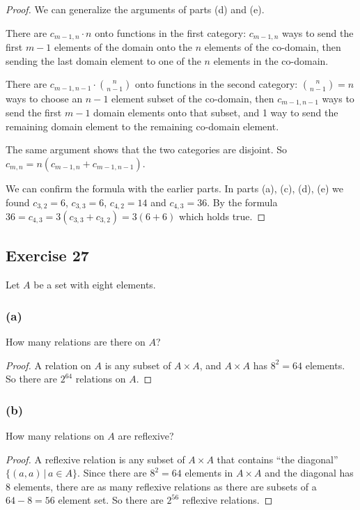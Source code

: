 \documentclass[14pt]{extarticle}
\begin{document}
\begin{proof}
We can generalize the arguments of parts (d) and (e). 

There are \(c_{m-1,n} \cdot n\) onto functions in the first category: \(c_{m-1,n}\) ways to send the first \(m-1\) 
elements of the domain onto the \(n\) elements of the co-domain, then sending the last domain element to one of the 
\(n\) elements in the co-domain.

There are \(c_{m-1,n-1} \cdot \binom{n}{n-1}\) onto functions in the second category: \(\binom{n}{n-1} = n\) ways to choose
an \(n-1\) element subset of the co-domain, then \(c_{m-1,n-1}\) ways to send the first \(m-1\) domain elements onto that
subset, and 1 way to send the remaining domain element to the remaining co-domain element.

The same argument shows that the two categories are disjoint. So \(c_{m,n} = n(c_{m-1,n} + c_{m-1,n-1})\). 

We can confirm the formula with the earlier parts. In parts (a), (c), (d), (e) we found \(c_{3,2} = 6\), \(c_{3,3} = 6\),  
\(c_{4,2} = 14\) and \(c_{4,3} = 36\). By the formula \(36 = c_{4,3} = 3(c_{3,3} + c_{3,2}) = 3(6+6)\) which holds true.
\end{proof}

\subsection{Exercise 27}
Let \(A\) be a set with eight elements.

\subsubsection{(a)}
How many relations are there on \(A\)?

\begin{proof}
A relation on \(A\) is any subset of \(A \times A\), and \(A \times A\) has \(8^2 = 64\) elements. So there are \(2^{64}\) 
relations on \(A\).
\end{proof}

\subsubsection{(b)}
How many relations on \(A\) are reflexive?

\begin{proof}
A reflexive relation is any subset of \(A \times A\) that contains ``the diagonal'' \(\{(a,a) \,|\, a \in A\}\). Since
there are \(8^2 = 64\) elements in \(A \times A\) and the diagonal has 8 elements, there are as many reflexive relations
as there are subsets of a \(64-8 = 56\) element set. So there are \(2^{56}\) reflexive relations.
\end{proof}
\end{document}
